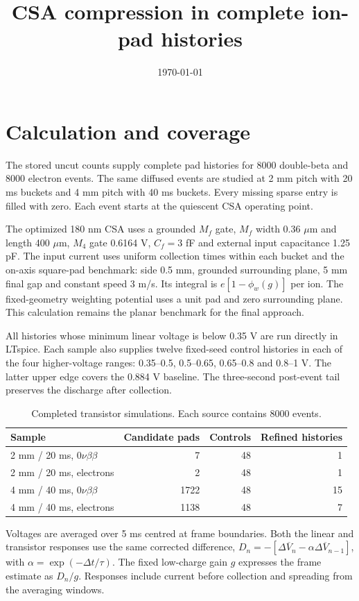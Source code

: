 \documentclass[11pt,a4paper]{article}
\title{CSA compression in complete ion-pad histories}
\date{\today}
\begin{document}
\maketitle
\section{Calculation and coverage}
The stored uncut counts supply complete pad histories for 8000 double-beta and
8000 electron events. The same diffused events are studied at 2 mm pitch with
20 ms buckets and 4 mm pitch with 40 ms buckets. Every missing sparse entry is
filled with zero. Each event starts at the quiescent CSA operating point.

The optimized 180 nm CSA uses a grounded $M_f$ gate, $M_f$ width 0.36 $\mu$m and
length 400 $\mu$m, $M_4$ gate 0.6164 V, $C_f=3$ fF and external input
capacitance 1.25 pF. The input current uses uniform collection times within each
bucket and the on-axis square-pad benchmark: side 0.5 mm, grounded surrounding
plane, 5 mm final gap and constant speed 3 m/s. Its integral is
$e[1-\phi_w(g)]$ per ion. The fixed-geometry weighting potential uses a unit pad
and zero surrounding plane. This calculation remains the planar benchmark for
the final approach.

All histories whose minimum linear voltage is below 0.35 V are run directly
in LTspice. Each sample also supplies twelve fixed-seed control histories in
each of the four higher-voltage ranges: 0.35--0.5, 0.5--0.65, 0.65--0.8 and
0.8--1 V. The latter upper edge covers the 0.884 V baseline. The three-second
post-event tail preserves the discharge after collection.

\begin{table}[ht]\centering
\begin{tabular}{lrrr}\toprule
Sample & Candidate pads & Controls & Refined histories\\\midrule
2 mm / 20 ms, $0\nu\beta\beta$ & 7 & 48 & 1 \\
2 mm / 20 ms, electrons & 2 & 48 & 1 \\
4 mm / 40 ms, $0\nu\beta\beta$ & 1722 & 48 & 15 \\
4 mm / 40 ms, electrons & 1138 & 48 & 7 \\
\bottomrule\end{tabular}
\caption{Completed transistor simulations. Each source contains 8000 events.}
\end{table}

Voltages are averaged over 5 ms centred at frame boundaries. Both the linear
and transistor responses use the same corrected difference,
$D_n=-[\Delta\overline V_n-\alpha\Delta\overline V_{n-1}]$, with
$\alpha=\exp(-\Delta t/\tau)$. The fixed low-charge gain $g$ expresses the
frame estimate as $D_n/g$. Responses include current before collection and
spreading from the averaging windows.
\end{document}
